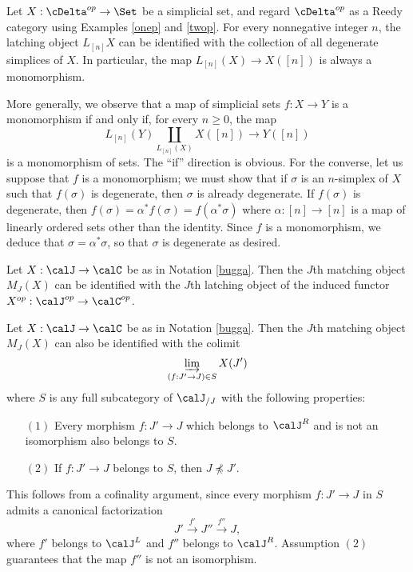 \begin{Model Categories}
\begin{Didn't Read}
\begin{example}\label{croupus}
Let $X: \cDelta^{op} \rightarrow \Set$ be a simplicial set, and regard
$\cDelta^{op}$ as a Reedy category using Examples \ref{onep} and \ref{twop}.
For every nonnegative integer $n$, the latching object $L_{[n]} X$ can be identified
with the collection of all degenerate simplices of $X$. In particular, the map
$L_{[n]}(X) \rightarrow X([n])$ is always a monomorphism.

More generally, we observe that a map of simplicial sets $f: X \rightarrow Y$ is a monomorphism if and only if, for every $n \geq 0$, the map
$$ L_{[n]}(Y) \coprod_{ L_{[n]}(X) } X([n]) \rightarrow Y([n])$$
is a monomorphism of sets. The ``if'' direction is obvious. For the converse,
let us suppose that $f$ is a monomorphism; we must show that if
$\sigma$ is an $n$-simplex of $X$ such that $f(\sigma)$ is degenerate, then
$\sigma$ is already degenerate. If $f(\sigma)$ is degenerate, then
$f(\sigma) = \alpha^{\ast} f(\sigma) = f( \alpha^{\ast} \sigma)$ where $\alpha: [n] \rightarrow [n]$ is a map of linearly ordered sets other than the identity. Since $f$ is a monomorphism, we deduce that $\sigma = \alpha^{\ast} \sigma$, so that $\sigma$ is degenerate as desired.
\end{example}

\begin{remark}
Let $X: \calJ \rightarrow \calC$ be as in Notation \ref{bugga}. Then the
$J$th matching object $M_{J}(X)$ can be identified with the $J$th latching object
of the induced functor $X^{op}: \calJ^{op} \rightarrow \calC^{op}$. 
\end{remark}

\begin{remark}\label{surpose}
Let $X: \calJ \rightarrow \calC$ be as in Notation \ref{bugga}. Then the
$J$th matching object $M_{J}(X)$ can also be identified with the colimit
$$ \varinjlim_{(f: J' \rightarrow J) \in S} X(J')$$
where $S$ is any full subcategory of $\calJ_{/J}$ with the following properties:
\begin{itemize}
\item[$(1)$] Every morphism $f: J' \rightarrow J$ which belongs to
$\calJ^{R}$ and is not an isomorphism also belongs to $S$.
\item[$(2)$] If $f: J' \rightarrow J$ belongs to $S$, then
$J \npreceq J'$.
\end{itemize}
This follows from a cofinality argument, since every morphism
$f: J' \rightarrow J$ in $S$ admits a canonical factorization
$$ J' \stackrel{f'}{\rightarrow} J'' \stackrel{f''}{\rightarrow} J,$$
where $f'$ belongs to $\calJ^{L}$ and $f''$ belongs to $\calJ^{R}$. Assumption
$(2)$ guarantees that the map $f''$ is not an isomorphism.


\end{remark}
\end{Didn't Read}
\end{Model Categories}
